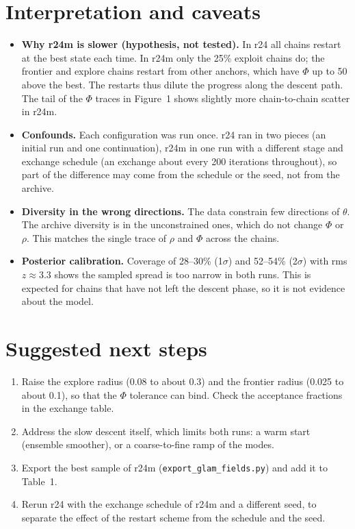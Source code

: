 \documentclass[11pt]{article}
\begin{document}
\section{Interpretation and caveats}
\begin{itemize}
\item \textbf{Why r24m is slower (hypothesis, not tested).} In r24 all chains restart at the best state each time. In r24m only the 25\% exploit chains do; the frontier and explore chains restart from other anchors, which have $\Phi$ up to 50 above the best. The restarts thus dilute the progress along the descent path. The tail of the $\Phi$ traces in Figure~1 shows slightly more chain-to-chain scatter in r24m.
\item \textbf{Confounds.} Each configuration was run once. r24 ran in two pieces (an initial run and one continuation), r24m in one run with a different stage and exchange schedule (an exchange about every 200 iterations throughout), so part of the difference may come from the schedule or the seed, not from the archive.
\item \textbf{Diversity in the wrong directions.} The data constrain few directions of $\theta$. The archive diversity is in the unconstrained ones, which do not change $\Phi$ or $\rho$. This matches the single trace of $\rho$ and $\Phi$ across the chains.
\item \textbf{Posterior calibration.} Coverage of 28--30\% (1$\sigma$) and 52--54\% (2$\sigma$) with rms $z\approx3.3$ shows the sampled spread is too narrow in both runs. This is expected for chains that have not left the descent phase, so it is not evidence about the model.
\end{itemize}

\section{Suggested next steps}
\begin{enumerate}
\item Raise the explore radius (0.08 to about 0.3) and the frontier radius (0.025 to about 0.1), so that the $\Phi$ tolerance can bind. Check the acceptance fractions in the exchange table.
\item Address the slow descent itself, which limits both runs: a warm start (ensemble smoother), or a coarse-to-fine ramp of the modes.
\item Export the best sample of r24m (\texttt{export\_glam\_fields.py}) and add it to Table~1.
\item Rerun r24 with the exchange schedule of r24m and a different seed, to separate the effect of the restart scheme from the schedule and the seed.
\end{enumerate}
\end{document}
